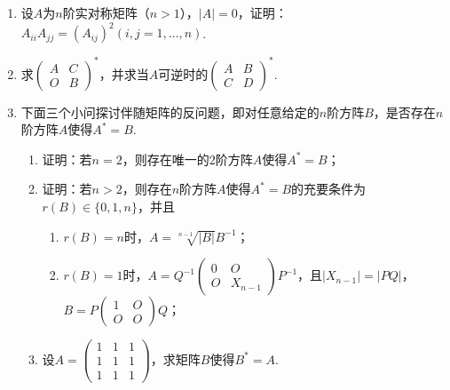 \begin{enumerate}
    \item 设$A$为$n$阶实对称矩阵（$n>1$），$|A|=0$，证明：$A_{ii}A_{jj}=(A_{ij})^2(i,j=1,\ldots,n)$.

    \item 求$\begin{pmatrix}
                  A & C \\ O & B
              \end{pmatrix}^*$，并求当$A$可逆时的$\begin{pmatrix}
                  A & B \\ C & D
              \end{pmatrix}^*$.

    \item 下面三个小问探讨伴随矩阵的反问题，即对任意给定的$n$阶方阵$B$，是否存在$n$阶方阵$A$使得$A^*=B$.
          \begin{enumerate}
              \item 证明：若$n=2$，则存在唯一的2阶方阵$A$使得$A^*=B$；

              \item 证明：若$n > 2$，则存在$n$阶方阵$A$使得$A^*=B$的充要条件为$r(B) \in \{0,1,n\}$，并且
                    \begin{enumerate}
                        \item $r(B)=n$时，$A=\sqrt[n-1]{|B|}B^{-1}$；

                        \item $r(B)=1$时，$A=Q^{-1}\begin{pmatrix}
                                      0 & O \\ O & X_{n-1}
                                  \end{pmatrix}P^{-1}$，且$|X_{n-1}|=|PQ|$，$B=P\begin{pmatrix}
                                      1 & O \\ O & O
                                  \end{pmatrix}Q$；
                    \end{enumerate}

              \item 设$A=\begin{pmatrix}
                            1 & 1 & 1 \\ 1 & 1 & 1 \\ 1 & 1 & 1
                        \end{pmatrix}$，求矩阵$B$使得$B^*=A$.
          \end{enumerate}


\end{enumerate}
